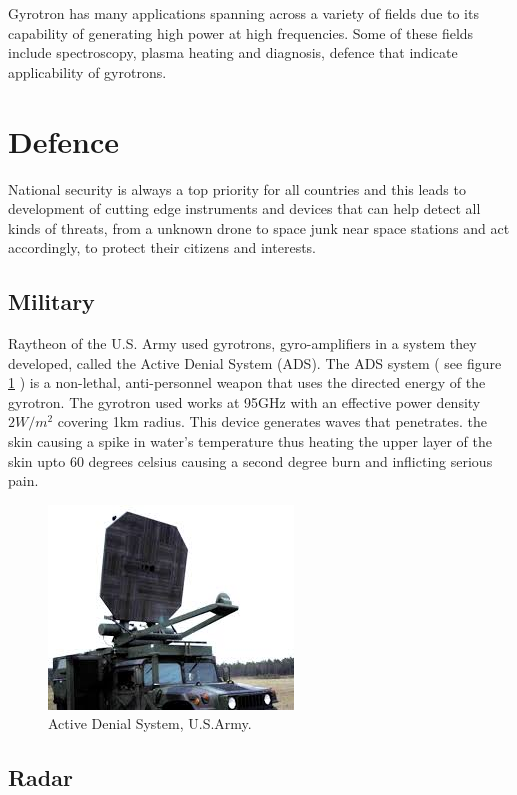 Gyrotron has many applications spanning across a variety of fields due to its capability of generating high power at high frequencies.
Some of these fields include spectroscopy, plasma heating and diagnosis, defence that indicate applicability of gyrotrons.

\section{Defence}

National security is always a top priority for all countries and this leads to development of cutting edge instruments and devices that can help detect all kinds of threats, from a unknown drone to space junk near space stations and act accordingly, to protect their citizens and interests.

\subsection{Military}

Raytheon of the U.S. Army used gyrotrons, gyro-amplifiers in a system they developed, called the Active Denial System (ADS). The ADS system ( see figure \ref{fig:ads} ) is a non-lethal, anti-personnel weapon that uses the directed energy of the gyrotron. The gyrotron used works at 95GHz with an effective power density $ 2W/m^2 $ covering 1km radius. This device generates waves that penetrates. the skin causing a spike in water's temperature thus heating the upper layer of the skin upto 60 degrees celsius causing a second degree burn and inflicting serious pain.

\begin{figure}[h]
\centering
\includegraphics{images/ads}
\caption{Active Denial System, U.S.Army.}
\label{fig:ads}
\end{figure}

\subsection{Radar}

